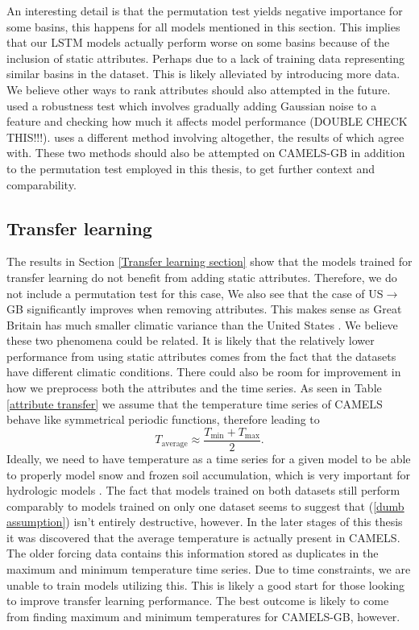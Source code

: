 An interesting detail is that the permutation test yields negative importance 
for some basins, this happens for all models mentioned in this section. 
This implies that our LSTM models actually perform worse 
on some basins because of the inclusion of static attributes. Perhaps due to a 
lack of training data representing similar basins in the dataset. This is likely 
alleviated by introducing more data. We believe other ways to rank attributes 
should also attempted 
in the future. \citet{lstm_second_paper} used a robustness test which 
involves gradually adding Gaussian noise to a feature and checking how much it 
affects model performance (DOUBLE CHECK THIS!!!). \citet{OrigCAMELSRanking} 
uses a different method involving altogether, the results of which \cite{lstm_second_paper} 
agree with. These two methods should also be attempted on CAMELS-GB in addition 
to the permutation test employed in this thesis, to get further context and comparability.

\subsection{Transfer learning}
The results in Section \ref{Transfer learning section} show that the models trained 
for transfer learning do not benefit from adding static attributes. Therefore, we 
do not include a permutation test for this case, We also see 
that the case of US$\rightarrow$GB significantly improves when removing attributes. This makes 
sense as Great Britain has much smaller climatic variance than the United States 
\citationneeded. We believe these two phenomena could be related. It is likely 
that the relatively lower performance from using static attributes comes from the 
fact that the datasets have different climatic conditions. There could also be 
room for improvement in how we preprocess both the attributes and the time series. 
As seen in Table \ref{attribute transfer} we assume that the temperature time series 
of CAMELS behave like symmetrical periodic functions, therefore leading to 
\begin{equation}
T_\text{average} \approx  \frac{T_\text{min}+T_\text{max}}{2}. \label{dumb assumption}
\end{equation}
Ideally, we need to have temperature as a time series for a given model to be able 
to properly model snow and frozen soil accumulation, which is very important for 
hydrologic models \citationneeded. The fact that models trained on both datasets 
still perform comparably to models trained on only one dataset seems to suggest 
that (\ref{dumb assumption}) isn't entirely destructive, however.
In the later stages of this thesis it was discovered that the average temperature 
is actually present in CAMELS. The older \citationneeded forcing data contains 
this information stored as duplicates in the maximum and minimum temperature time 
series. Due to time constraints, we are unable to train models utilizing this. 
This is likely a good start for those looking to improve transfer learning performance. 
The best outcome is likely to come from finding maximum and minimum temperatures 
for CAMELS-GB, however.

